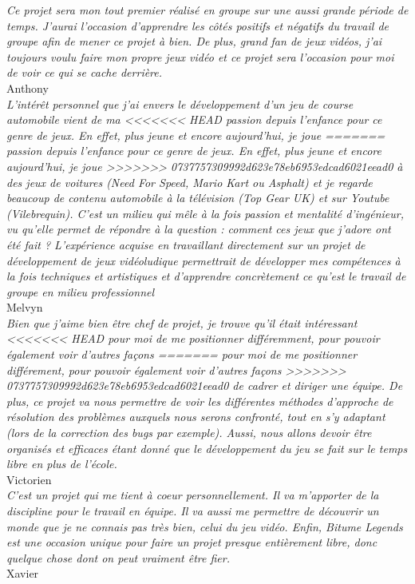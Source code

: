 \documentclass[12pt,a4paper]{article}
\begin{document}
\indent\textit{Ce projet sera mon tout premier réalisé en groupe sur une aussi grande période de temps. 
    J'aurai l'occasion d'apprendre les côtés positifs et négatifs du travail de groupe afin de mener ce 
    projet à bien. De plus, grand fan de jeux vidéos, j'ai toujours voulu faire mon propre jeux vidéo et ce 
projet sera l'occasion pour moi de voir ce qui se cache derrière.} \\
\indent Anthony\\[0.3cm]
\indent\textit{L'intérêt personnel que j'ai envers le développement d'un jeu de course automobile vient de ma 
<<<<<<< HEAD
    passion depuis l'enfance pour ce genre de jeux. En effet, plus jeune et encore aujourd’hui, je joue
=======
    passion depuis l'enfance pour ce genre de jeux. En effet, plus jeune et encore aujourd'hui, je joue
>>>>>>> 0737757309992d623e78eb6953edcad6021eead0
    à des jeux de voitures (Need For Speed, Mario Kart ou Asphalt) et je regarde beaucoup de contenu automobile
    à la télévision (Top Gear UK) et sur Youtube (Vilebrequin). C'est un milieu qui mêle à la fois passion et 
    mentalité d'ingénieur, vu qu'elle permet de répondre à la question : comment ces jeux que j'adore ont été 
    fait ? L'expérience acquise en travaillant directement sur un projet de développement de jeux vidéoludique 
    permettrait de développer mes compétences à la fois techniques et artistiques et d'apprendre concrètement 
ce qu'est le travail de groupe en milieu professionnel} \\
\indent Melvyn\\[0.3cm]
\indent\textit{Bien que j'aime bien être chef de projet, je trouve qu'il était intéressant 
<<<<<<< HEAD
    pour moi de me positionner différemment, pour pouvoir également voir d'autres façons 
=======
    pour moi de me positionner différement, pour pouvoir également voir d'autres façons 
>>>>>>> 0737757309992d623e78eb6953edcad6021eead0
    de cadrer et diriger une équipe. De plus, ce projet va nous permettre de voir les différentes
    méthodes d'approche de résolution des problèmes auxquels nous serons confronté, tout en s'y
    adaptant (lors de la correction des bugs par exemple). Aussi, nous allons devoir être organisés
et efficaces étant donné que le développement du jeu se fait sur le temps libre en plus de l'école.} \\
\indent Victorien\\[0.3cm]
\indent\textit{C'est un projet qui me tient à coeur personnellement. Il va m'apporter de la discipline pour le travail
    en équipe. Il va aussi me permettre de découvrir un monde que je ne connais pas très bien, celui du jeu vidéo.
    Enfin, Bitume Legends est une occasion unique pour faire un projet presque entièrement libre, donc quelque
chose dont on peut vraiment être fier.} \\
\indent Xavier
\clearpage
\end{document}
